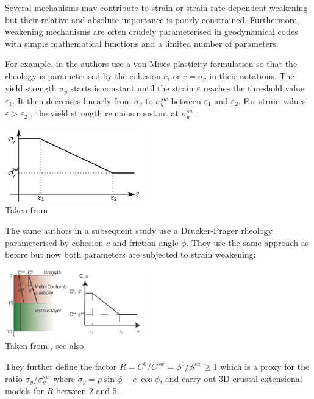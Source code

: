 Several mechanisms may contribute to strain or strain
rate dependent weakening but their relative and absolute
importance is poorly constrained. Furthermore, 
weakening mechanisms are often crudely parameterised in 
geodynamical codes with simple mathematical functions 
and a limited number of parameters. 

For example, in \cite{alht11} the authors use a von Mises plasticity formulation so that the 
rheology is parameterised by the cohesion $c$, or $c=\sigma_y$ in their notations. The
yield strength $\sigma_y$ starts is constant until the strain
$\varepsilon$ reaches the threshold value $\varepsilon_1$. It then decreases linearly
from $\sigma_y$ to $\sigma_{y}^{sw}$ between $\varepsilon_1$ and $\varepsilon_2$. 
For strain values $\varepsilon>\varepsilon_2$ , the yield strength remains constant 
at $\sigma_y^{sw}$ .

\begin{center}
\includegraphics[width=6cm]{images/strainweakening/alht11}\\
{\tiny Taken from \cite{alht11}}
\end{center}

The same authors in a subsequent study use a Drucker-Prager rheology parameterised by 
cohesion $c$ and friction angle $\phi$. They use the same approach as before but now 
both parameters are subjected to strain weakening: 

\begin{center}
\includegraphics[width=6cm]{images/strainweakening/alht12}\\
{\tiny Taken from \cite{alht12}, see also \cite{thie11}}
\end{center}

They further define the factor $R=C^0/C^{sw}=\phi^0/\phi^{sw}\geq 1$ which is a proxy
for the ratio $\sigma_y/\sigma_y^{sw}$ where $\sigma_y=p \sin\phi + c \; \cos \phi$, 
and carry out 3D crustal extensional models for $R$ between 2 and 5. 



